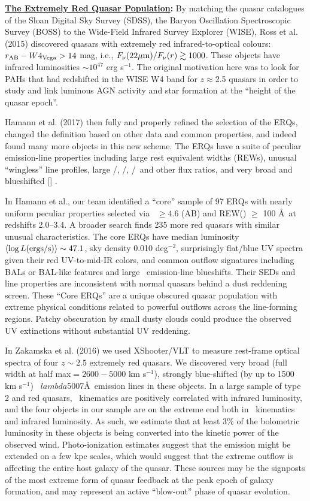 \smallskip
\smallskip
\noindent
{\bf \underline{The Extremely Red Quasar Population}:}
By matching the quasar catalogues of the Sloan Digital Sky Survey
(SDSS), the Baryon Oscillation Spectroscopic Survey (BOSS) to the
Wide-Field Infrared Survey Explorer (WISE), Ross et al. (2015)
discovered quasars with extremely red infrared-to-optical colours:
$r_{\rm AB}-W4_{\rm Vega}>14$ mag, i.e., $F_\nu({\rm 22\mu
m})/F_\nu(r) \gtrsim 1000$.  These objects have infrared luminosities
$\sim 10^{47}$ erg s$^{-1}$.  The original motivation here was to look
for PAHs that had redshifted in the WISE W4 band for $z\approx$2.5
quasars in order to study and link luminous AGN activity and star
formation at the ``height of the quasar epoch''.

Hamann et al. (2017) then fully and properly refined the selection of
the ERQs, changed the definition based on other data and common
properties, and indeed found many more objects in this new scheme. The
ERQs have a suite of peculiar emission-line properties including large
rest equivalent widths (REWs), unusual ``wingless'' line profiles,
large \nv /\lya , \nv /\civ , \siiv /\civ\ and other flux ratios, and
very broad and blueshifted [\oiii ] .

In Hamann et al., our team identified a ``core'' sample of 97 ERQs
with nearly uniform peculiar properties selected via \imw\ $\ge 4.6$
(AB) and REW(\civ ) $\ge$ 100 \AA\ at redshifts 2.0--3.4. A broader
search finds 235 more red quasars with similar unusual
characteristics. The core ERQs have median luminosity $\left<\log L
({\rm ergs/s})\right> \sim 47.1$, sky density 0.010 deg$^{-2}$,
surprisingly flat/blue UV spectra given their red UV-to-mid-IR colors,
and common outflow signatures including BALs or BAL-like features and
large \civ\ emission-line blueshifts. Their SEDs and line properties
are inconsistent with normal quasars behind a dust reddening
screen. These ``Core ERQs'' are a unique obscured quasar population
with extreme physical conditions related to powerful outflows across
the line-forming regions. Patchy obscuration by small dusty clouds
could produce the observed UV extinctions without substantial UV
reddening.


\smallskip
\smallskip
\noindent
In Zakamska et al. (2016) we used XShooter/VLT to measure rest-frame
optical spectra of four $z\sim 2.5$ extremely red quasars. We
discovered very broad (full width at half max$= 2600-5000$ km
s$^{-1}$), strongly blue-shifted (by up to 1500 km s$^{-1}$)
\oiii\ $lambda$5007\AA\ emission lines in these objects. In a large
sample of type 2 and red quasars, \oiii\ kinematics are positively
correlated with infrared luminosity, and the four objects in our
sample are on the extreme end both in \oiii\ kinematics and infrared
luminosity.
As such, we estimate that at least 3\% of the bolometric luminosity in
these objects is being converted into the kinetic power of the
observed wind. Photo-ionization estimates suggest that the \oiii
emission might be extended on a few kpc scales, which would suggest
that the extreme outflow is affecting the entire host galaxy of the
quasar. These sources may be the signposts of the most extreme form of
quasar feedback at the peak epoch of galaxy formation, and may
represent an active ``blow-out'' phase of quasar evolution. 


